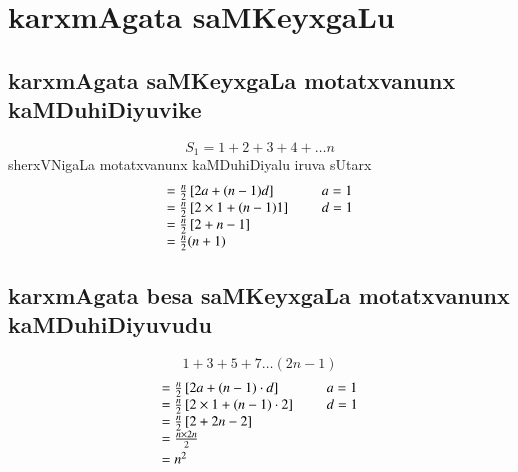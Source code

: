 \chapter{karxmAgata saMKeyxgaLu}

\section*{\;karxmAgata saMKeyxgaLa motatxvanunx kaMDuhiDiyuvike}
$$
S_{1} = 1+2+3+4+\ldots n 
$$
sherxVNigaLa motatxvanunx kaMDuhiDiyalu iruva sUtarx
$$
\begin{array}[t]{l}
=\frac{n}{2}\left[2a+(n-1)d\right]\\
=\frac{n}{2}\left[2\times 1 +(n-1)1\right]\\
=\frac{n}{2}\left[2+n-1\right] \\
=\frac{n}{2}(n+1)
\end{array}
\hspace{0.5cm}
\begin{array}[t]{l}
a = 1\\
d=1
\end{array}
$$

\section*{\;karxmAgata besa saMKeyxgaLa motatxvanunx kaMDuhiDiyuvudu}
$$
1+3+5+7\ldots(2n-1)
$$
$$
\begin{array}[t]{l}
=\frac{n}{2}\left[2a+(n-1)\cdot d\right] \\
=\frac{n}{2}\left[2\times 1 +(n-1)\cdot 2\right]\\
=\frac{n}{2}\left[2+2n-2\right]\\
=\frac{{n \times 2n}}{2}\\[0.1cm]
=n^{2}
\end{array}
\hspace{0.5cm}
\begin{array}[t]{l}
a = 1\\
d=1
\end{array}
$$

